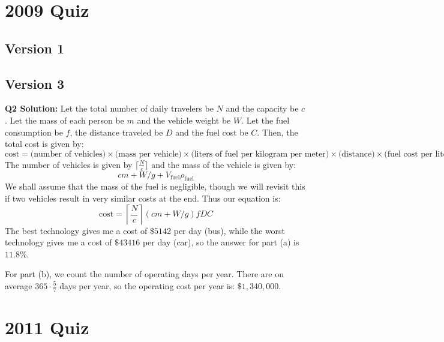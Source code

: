 \documentclass{article}
\begin{document}
\section*{2009 Quiz}
\subsection*{Version 1}

\subsection*{Version 3}
\textbf{Q2 Solution:} Let the total number of daily travelers be $N$ and the capacity be $c$. Let the mass of each person be $m$ and the vehicle weight be $W$. Let the fuel consumption be $f$, the distance traveled be $D$ and the fuel cost be $C$. Then, the total cost is given by:
\begin{equation}
    \text{cost} = \text{(number of vehicles)} \times \text{(mass per vehicle)} \times \text{(liters of fuel per kilogram per meter)} \times \text{(distance)} \times \text{(fuel cost per liter)}
    \label{eq:}
\end{equation}
The number of vehicles is given by $\lceil\frac{N}{c}\rceil$ and the mass of the vehicle is given by: $$cm+W/g+V_\text{fuel}\rho_\text{fuel}$$
We shall assume that the mass of the fuel is negligible, though we will revisit this if two vehicles result in very similar costs at the end. Thus our equation is:
\begin{equation}
    \text{cost} = \left\lceil\frac{N}{c}\right\rceil(cm+W/g)fDC
    \label{eq:}
\end{equation}
The best technology gives me a cost of $\$5142$ per day (bus), while the worst technology gives me a cost of $\$43416$ per day (car), so the answer for part (a) is $\boxed{11.8\%}$.

For part (b), we count the number of operating days per year. There are on average $365 \cdot \frac{5}{7}$ days per year, so the operating cost per year is: $\boxed{\$ 1,340,000}$.
\section*{2011 Quiz}
\end{document}
